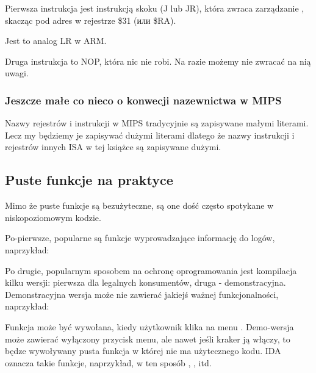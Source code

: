 
Pierwsza instrukcja jest instrukcją skoku (J lub JR),
która zwraca zarządzanie , skacząc pod adres w rejestrze \$31 (или \$RA).

Jest to analog \ac{LR} w ARM.

Druga instrukcja to \ac{NOP}, która nic nie robi.
Na razie możemy nie zwracać na nią uwagi.

\subsubsection{Jeszcze małe co nieco o konwecji nazewnictwa w MIPS}
Nazwy rejestrów i instrukcji w MIPS tradycyjnie są zapisywane małymi literami.
Lecz my będziemy je zapisywać dużymi literami dlatego że nazwy instrukcji i rejestrów innych 
\ac{ISA} w tej książce są zapisywane dużymi.

\subsection{Puste funkcje na praktyce}

Mimo że puste funkcje są bezużyteczne, są one dość często spotykane w niskopoziomowym kodzie.

Po-pierwsze, popularne są funkcje wyprowadzające informację do logów, naprzykład:



Po drugie, popularnym sposobem na ochronę oprogramowania jest kompilacja kilku wersji: pierwsza dla legalnych konsumentów, druga - demonstracyjna. Demonstracyjna wersja może nie zawierać jakiejś ważnej funkcjonalności, naprzykład:


Funkcja  może być wywołana, kiedy użytkownik klika na menu .
Demo-wersja może zawierać wyłączony przycisk menu, ale nawet jeśli kraker ją włączy, to będze wywoływany pusta funkcja w której nie ma użytecznego kodu.
IDA oznacza takie funkcje, naprzykład, w ten sposób , , itd.


